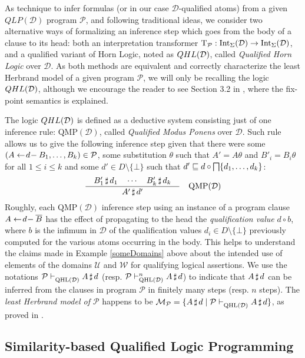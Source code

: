\documentclass{sigplanconf}
\newcommand{\qdom}{\mathcal{D}} \newcommand{\dqdom}{D \setminus \{\bot\}} \newcommand{\bqdom}{(D \setminus \{\bot\}) \uplus \{?\}}
\newcommand{\U}{\mathcal{U}}
\newcommand{\W}{\mathcal{W}}
\newcommand{\qlp}[1]{QLP({#1})} \newcommand{\slp}[2]{SLP({#1,#2})} \newcommand{\sqlp}[2]{SQLP({#1,#2})} \newcommand{\bqlp}[1]{BQLP({#1})} \newcommand{\clp}[1]{CLP({#1})}
\newcommand{\Prog}{\mathcal{P}} \newcommand{\UProg}{\mathcal{P_U}}
\theoremstyle{definition}
\theoremstyle{plain}
\begin{document}
As technique to infer formulas (or in our case $\qdom$-qualified atoms) from a given $\qlp{\qdom}$ program $\Prog$, and following traditional ideas, we consider two alternative ways of formalizing an inference step which goes from the body of a clause to its head: both an interpretation transformer $\Tp : \intd \to \intd$, and a qualified variant of Horn Logic, noted as $\qhl{\qdom}$, called \emph{Qualified Horn Logic} over $\qdom$. As both methods are equivalent and correctly characterize the least Herbrand model of a given program $\Prog$, we will only be recalling the logic $\qhl{\qdom}$, although we encourage the reader to see Section 3.2 in \cite{RR08}, where the fix-point semantics is explained.

The logic $\qhl{\qdom}$ is defined as a deductive system consisting just of one inference rule: $\mbox{QMP}(\qdom)$, called \emph{Qualified Modus Ponens} over $\qdom$. Such rule allows us to give the following inference step given that there were some $(A \qgets{d} B_1, \ldots, B_k) \in \Prog$, some substitution $\theta$ such that $A' = A\theta$ and $B'_i = B_i\theta$ for all $1 \le i \le k$ and some $d' \in \dqdom$ such that $d' \sqsubseteq d \circ \bigsqcap \{d_1, \ldots, d_k\}$:
\[
    \frac
    {\quad \at{B'_{1}}{d_{1}} \quad \cdots \quad \at{B'_{k}}{d_{k}} \quad}
    {\at{A'}{d'}} \quad \mbox{QMP}(\qdom)
\]
Roughly, each $\mbox{QMP}(\qdom)$ inference step using an instance of a program clause $A \gets\!d\!- \overline{B}$ has the effect of propagating to the head the {\em qualification value} $d \circ b$, where $b$ is the infimum in $\qdom$ of the qualification values  $d_i \in \dqdom$ previously computed for the various atoms occurring in the body. This helps to understand the claims made in Example \ref{someDomains} above about the intended use of elements of the domains $\U$ and $\W$ for qualifying logical assertions. We use the notations $\Prog \qhld \at{A}{d}$ (resp. $\Prog \qhldn{n} \at{A}{d}$) to indicate that $A\,\sharp\,d$ can be inferred from the clauses in program $\Prog$ in finitely many steps (resp. $n$ steps). The \emph{least Herbrand model of $\Prog$} happens to be $\Mp = \{\at{A}{d} \mid \Prog \qhld \at{A}{d}\}$, as proved in \cite{RR08}.

\subsection{Similarity-based Qualified Logic Programming} \label{SQLP}
\end{document}
